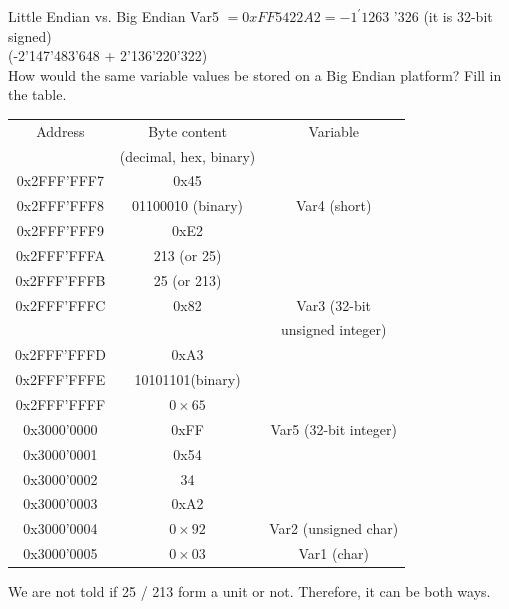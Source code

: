 \begin{example2}{Little Endian vs. Big Endian}
Var5 $=0 x F F 5422 A 2=-1^{\prime} 1263$ '326 (it is 32-bit signed)\\
(-2'147'483'648 + 2'136'220'322)
\vspace{2mm}\\
How would the same variable values be stored on a Big Endian platform? Fill in the table.
\begin{center}
\begin{tabular}{|c|c|c|}
\hline
Address & Byte content & Variable \\
& (decimal, hex, binary) & \\
\hline
0x2FFF'FFF7 & 0x45 &  \\
\hline
0x2FFF'FFF8 & 01100010 (binary) & Var4 (short) \\
\hline
0x2FFF'FFF9 & 0xE2 &  \\
\hline
0x2FFF'FFFA & 213 (or 25) &  \\
\hline
0x2FFF'FFFB & 25 (or 213) &  \\
\hline
0x2FFF'FFFC & 0x82 & Var3 (32-bit  \\
& & unsigned integer) \\
\hline
0x2FFF'FFFD & 0xA3 &  \\
\hline
0x2FFF'FFFE & 10101101(binary) &  \\
\hline
0x2FFF'FFFF & $0 \times 65$ &  \\
\hline
0x3000'0000 & 0xFF & Var5 (32-bit integer) \\
\hline
0x3000'0001 & 0x54 &  \\
\hline
0x3000'0002 & 34 &  \\
\hline
0x3000'0003 & 0xA2 &  \\
\hline
0x3000'0004 & $0 \times 92$ & Var2 (unsigned char) \\
\hline
0x3000'0005 & $0 \times 03$ & Var1 (char) \\
\hline
\end{tabular}
\end{center}
We are not told if 25 / 213 form a unit or not. Therefore, it can be both ways.
\end{example2}


